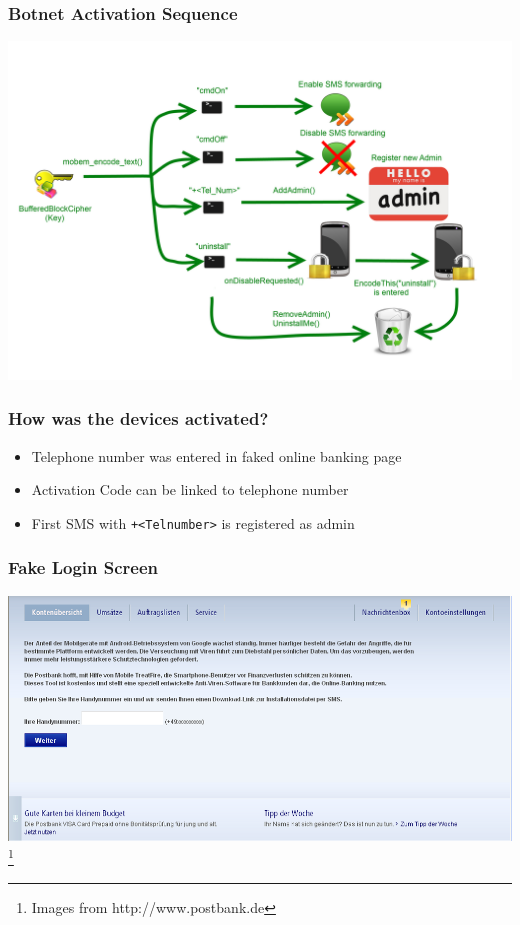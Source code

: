 \documentclass[12pt,a4paper]{beamer}
\newcommand\blfootnote[1]{%
  \begingroup
  \renewcommand\thefootnote{}\footnote{#1}%
  \addtocounter{footnote}{-1}%
  \endgroup
}
\begin{document}
\begin{frame}
\frametitle{Botnet Activation Sequence}
\includegraphics[height=0.9\textheight]{images/behaviour.png}
\end{frame}


\begin{frame}
\frametitle{How was the devices activated?}
\begin{itemize}
\item Telephone number was entered in faked online banking page
\item Activation Code can be linked to telephone number
\item First SMS with \texttt{+<Telnumber>} is registered as admin
\end{itemize}

\end{frame}



\begin{frame}
\frametitle{Fake Login Screen}
\includegraphics[width=\textwidth]{images/abfrage-der-rufnummer.png}
\blfootnote{Images from http://www.postbank.de}
\end{frame}
\end{document}

